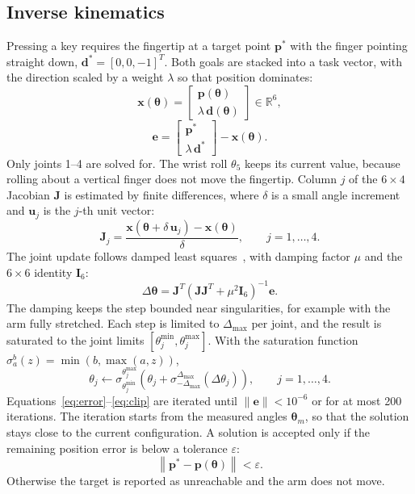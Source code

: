 \documentclass[conference]{IEEEtran}
\newcommand{\vect}[1]{\boldsymbol{#1}}
\begin{document}
\subsection{Inverse kinematics}
Pressing a key requires the fingertip at a target point $\vect{p}^*$ with the finger pointing straight down, $\vect{d}^*=[0,0,-1]^T$. Both goals are stacked into a task vector, with the direction scaled by a weight $\lambda$ so that position dominates:
\begin{equation}
\vect{x}(\boldsymbol{\theta}) = \begin{bmatrix}\vect{p}(\boldsymbol{\theta})\\ \lambda\,\vect{d}(\boldsymbol{\theta})\end{bmatrix}\in\mathbb{R}^6,
\label{eq:task}
\end{equation}
\begin{equation}
\vect{e} = \begin{bmatrix}\vect{p}^*\\ \lambda\,\vect{d}^*\end{bmatrix} - \vect{x}(\boldsymbol{\theta}).
\label{eq:error}
\end{equation}
Only joints 1--4 are solved for. The wrist roll $\theta_5$ keeps its current value, because rolling about a vertical finger does not move the fingertip. Column $j$ of the $6\times4$ Jacobian $\vect{J}$ is estimated by finite differences, where $\delta$ is a small angle increment and $\vect{u}_j$ is the $j$-th unit vector:
\begin{equation}
\vect{J}_{j} = \frac{\vect{x}(\boldsymbol{\theta}+\delta\,\vect{u}_j)-\vect{x}(\boldsymbol{\theta})}{\delta}, \qquad j=1,\dots,4.
\label{eq:jacobian}
\end{equation}
The joint update follows damped least squares~\cite{slides}, with damping factor $\mu$ and the $6\times6$ identity $\vect{I}_6$:
\begin{equation}
\Delta\boldsymbol{\theta} = \vect{J}^T\left(\vect{J}\vect{J}^T+\mu^2\vect{I}_6\right)^{-1}\vect{e}.
\label{eq:dls}
\end{equation}
The damping keeps the step bounded near singularities, for example with the arm fully stretched. Each step is limited to $\Delta_{\max}$ per joint, and the result is saturated to the joint limits $[\theta_j^{\min},\theta_j^{\max}]$. With the saturation function $\sigma_a^b(z)=\min(b,\max(a,z))$,
\begin{equation}
\theta_j \leftarrow \sigma_{\theta_j^{\min}}^{\theta_j^{\max}}\!\left(\theta_j+\sigma_{-\Delta_{\max}}^{\Delta_{\max}}(\Delta\theta_j)\right), \qquad j=1,\dots,4.
\label{eq:clip}
\end{equation}
Equations~\eqref{eq:error}--\eqref{eq:clip} are iterated until $\|\vect{e}\|<10^{-6}$ or for at most 200 iterations. The iteration starts from the measured angles $\boldsymbol{\theta}_m$, so that the solution stays close to the current configuration. A solution is accepted only if the remaining position error is below a tolerance $\varepsilon$:
\begin{equation}
\left\|\vect{p}^*-\vect{p}(\boldsymbol{\theta})\right\| < \varepsilon.
\label{eq:accept}
\end{equation}
Otherwise the target is reported as unreachable and the arm does not move.
\end{document}
